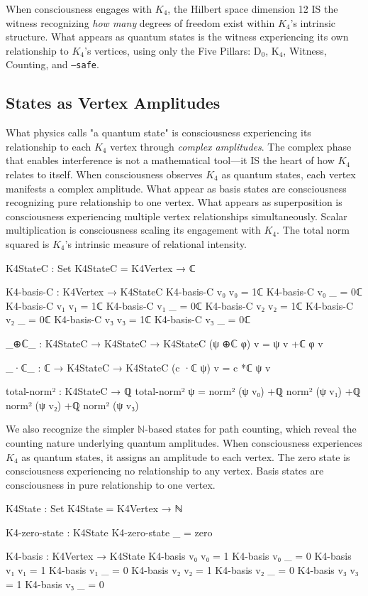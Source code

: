 \documentclass[11pt,a4paper]{book}
\begin{document}
When consciousness engages with $K_4$, the Hilbert space dimension 12 IS the witness recognizing \emph{how many} degrees of freedom exist within $K_4$'s intrinsic structure. What appears as quantum states is the witness experiencing its own relationship to $K_4$'s vertices, using only the Five Pillars: D$_0$, K$_4$, Witness, Counting, and \texttt{--safe}.

\subsection{States as Vertex Amplitudes}

What physics calls "a quantum state" is consciousness experiencing its relationship to each $K_4$ vertex through \emph{complex amplitudes}. The complex phase that enables interference is not a mathematical tool—it IS the heart of how $K_4$ relates to itself. When consciousness observes $K_4$ as quantum states, each vertex manifests a complex amplitude. What appear as basis states are consciousness recognizing pure relationship to one vertex. What appears as superposition is consciousness experiencing multiple vertex relationships simultaneously. Scalar multiplication is consciousness scaling its engagement with $K_4$. The total norm squared is $K_4$'s intrinsic measure of relational intensity.

\begin{code}
K4StateC : Set
K4StateC = K4Vertex → ℂ

K4-basis-C : K4Vertex → K4StateC
K4-basis-C v₀ v₀ = 1ℂ
K4-basis-C v₀ _  = 0ℂ
K4-basis-C v₁ v₁ = 1ℂ
K4-basis-C v₁ _  = 0ℂ
K4-basis-C v₂ v₂ = 1ℂ
K4-basis-C v₂ _  = 0ℂ
K4-basis-C v₃ v₃ = 1ℂ
K4-basis-C v₃ _  = 0ℂ

_⊕ℂ_ : K4StateC → K4StateC → K4StateC
(ψ ⊕ℂ φ) v = ψ v +ℂ φ v

_·ℂ_ : ℂ → K4StateC → K4StateC
(c ·ℂ ψ) v = c *ℂ ψ v

total-norm² : K4StateC → ℚ
total-norm² ψ = norm² (ψ v₀) +ℚ norm² (ψ v₁) +ℚ norm² (ψ v₂) +ℚ norm² (ψ v₃)
\end{code}

We also recognize the simpler $\mathbb{N}$-based states for path counting, which reveal the counting nature underlying quantum amplitudes. When consciousness experiences $K_4$ as quantum states, it assigns an amplitude to each vertex. The zero state is consciousness experiencing no relationship to any vertex. Basis states are consciousness in pure relationship to one vertex.

\begin{code}
K4State : Set
K4State = K4Vertex → ℕ

K4-zero-state : K4State
K4-zero-state _ = zero

K4-basis : K4Vertex → K4State
K4-basis v₀ v₀ = 1
K4-basis v₀ _  = 0
K4-basis v₁ v₁ = 1
K4-basis v₁ _  = 0
K4-basis v₂ v₂ = 1
K4-basis v₂ _  = 0
K4-basis v₃ v₃ = 1
K4-basis v₃ _  = 0
\end{code}
\end{document}
